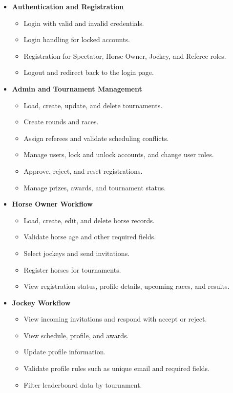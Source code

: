 \begin{itemize}
    \item \textbf{Authentication and Registration}
    \begin{itemize}
        \item Login with valid and invalid credentials.
        \item Login handling for locked accounts.
        \item Registration for Spectator, Horse Owner, Jockey, and Referee roles.
        \item Logout and redirect back to the login page.
    \end{itemize}

    \item \textbf{Admin and Tournament Management}
    \begin{itemize}
        \item Load, create, update, and delete tournaments.
        \item Create rounds and races.
        \item Assign referees and validate scheduling conflicts.
        \item Manage users, lock and unlock accounts, and change user roles.
        \item Approve, reject, and reset registrations.
        \item Manage prizes, awards, and tournament status.
    \end{itemize}

    \item \textbf{Horse Owner Workflow}
    \begin{itemize}
        \item Load, create, edit, and delete horse records.
        \item Validate horse age and other required fields.
        \item Select jockeys and send invitations.
        \item Register horses for tournaments.
        \item View registration status, profile details, upcoming races, and results.
    \end{itemize}

    \item \textbf{Jockey Workflow}
    \begin{itemize}
        \item View incoming invitations and respond with accept or reject.
        \item View schedule, profile, and awards.
        \item Update profile information.
        \item Validate profile rules such as unique email and required fields.
        \item Filter leaderboard data by tournament.
    \end{itemize}


\end{itemize}

